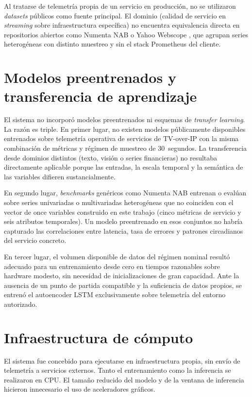 Al tratarse de telemetría propia de un servicio en producción, no se utilizaron \textit{datasets} públicos como fuente principal. El dominio (calidad de servicio en \textit{streaming} sobre infraestructura específica) no encuentra equivalencia directa en repositorios abiertos como Numenta NAB \citep{numenta_nab} o Yahoo Webscope \citep{yahoo_webscope}, que agrupan series heterogéneas con distinto muestreo y sin el stack Prometheus del cliente.

\section{Modelos preentrenados y transferencia de aprendizaje}
\label{sec:transfer-learning}

El sistema no incorporó modelos preentrenados ni esquemas de \textit{transfer learning}. La razón es triple. En primer lugar, no existen modelos públicamente disponibles entrenados sobre telemetría operativa de servicios de TV-over-IP con la misma combinación de métricas y régimen de muestreo de 30~segundos. La transferencia desde dominios distintos (texto, visión o series financieras) no resultaba directamente aplicable porque las entradas, la escala temporal y la semántica de las variables difieren sustancialmente.

En segundo lugar, \textit{benchmarks} genéricos como Numenta NAB entrenan o evalúan sobre series univariadas o multivariadas heterogéneas que no coinciden con el vector de once variables construido en este trabajo (cinco métricas de servicio y seis atributos temporales). Un modelo preentrenado en esos conjuntos no habría capturado las correlaciones entre latencia, tasa de errores y patrones circadianos del servicio concreto.

En tercer lugar, el volumen disponible de datos del régimen nominal resultó adecuado para un entrenamiento desde cero en tiempos razonables sobre hardware modesto, sin necesidad de inicializaciones de gran capacidad. Ante la ausencia de un punto de partida compatible y la suficiencia de datos propios, se entrenó el autoencoder LSTM exclusivamente sobre telemetría del entorno autorizado.

\section{Infraestructura de cómputo}
\label{sec:infraestructura}

El sistema fue concebido para ejecutarse en infraestructura propia, sin envío de telemetría a servicios externos. Tanto el entrenamiento como la inferencia se realizaron en CPU. El tamaño reducido del modelo y de la ventana de inferencia hicieron innecesario el uso de aceleradores gráficos.

